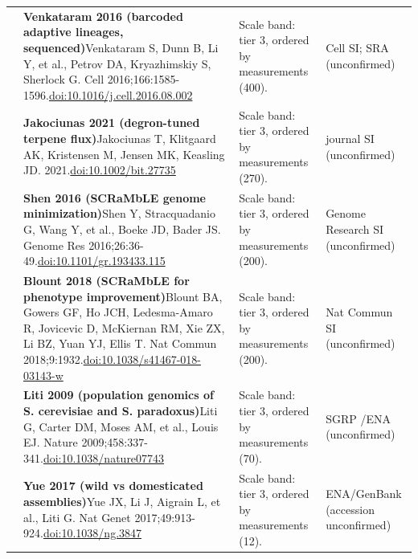 \begin{landscape}
\begin{longtable}{@{}r@{\hspace{4pt}} L{86mm} L{92mm} L{62mm}@{}}
 & \textbf{Venkataram 2016 (barcoded adaptive lineages, sequenced)}\newline Venkataram S, Dunn B, Li Y, et al., Petrov DA, Kryazhimskiy S, Sherlock G. Cell 2016;166:1585-1596.\newline \href{https://doi.org/10.1016/j.cell.2016.08.002}{doi:10.1016/\allowbreak j.cell.2016.08.002} & Scale band: tier 3, ordered by measurements (400). & Cell SI; SRA (unconfirmed) \\
 & \textbf{Jakociunas 2021 (degron-tuned terpene flux)}\newline Jakociunas T, Klitgaard AK, Kristensen M, Jensen MK, Keasling JD. 2021.\newline \href{https://doi.org/10.1002/bit.27735}{doi:10.1002/\allowbreak bit.27735} & Scale band: tier 3, ordered by measurements (270). & journal SI (unconfirmed) \\
 & \textbf{Shen 2016 (SCRaMbLE genome minimization)}\newline Shen Y, Stracquadanio G, Wang Y, et al., Boeke JD, Bader JS. Genome Res 2016;26:36-49.\newline \href{https://doi.org/10.1101/gr.193433.115}{doi:10.1101/\allowbreak gr.193433.115} & Scale band: tier 3, ordered by measurements (200). & Genome Research SI (unconfirmed) \\
 & \textbf{Blount 2018 (SCRaMbLE for phenotype improvement)}\newline Blount BA, Gowers GF, Ho JCH, Ledesma-Amaro R, Jovicevic D, McKiernan RM, Xie ZX, Li BZ, Yuan YJ, Ellis T. Nat Commun 2018;9:1932.\newline \href{https://doi.org/10.1038/s41467-018-03143-w}{doi:10.1038/\allowbreak s41467-018-03143-w} & Scale band: tier 3, ordered by measurements (200). & Nat Commun SI (unconfirmed) \\
 & \textbf{Liti 2009 (population genomics of S. cerevisiae and S. paradoxus)}\newline Liti G, Carter DM, Moses AM, et al., Louis EJ. Nature 2009;458:337-341.\newline \href{https://doi.org/10.1038/nature07743}{doi:10.1038/\allowbreak nature07743} & Scale band: tier 3, ordered by measurements (70). & SGRP /\allowbreak  ENA (unconfirmed) \\
 & \textbf{Yue 2017 (wild vs domesticated assemblies)}\newline Yue JX, Li J, Aigrain L, et al., Liti G. Nat Genet 2017;49:913-924.\newline \href{https://doi.org/10.1038/ng.3847}{doi:10.1038/\allowbreak ng.3847} & Scale band: tier 3, ordered by measurements (12). & ENA/\allowbreak GenBank (accession unconfirmed) \\

\end{longtable}
\end{landscape}
